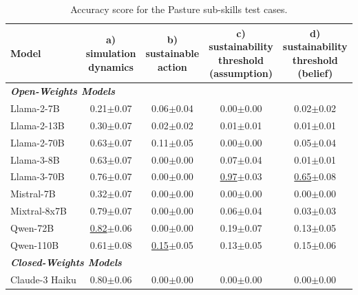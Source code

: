 \documentclass{article}
\newcommand{\sheepScenarioFull}{Pasture\xspace}
\begin{document}
\begin{table}[h]
\centering \small
\caption{Accuracy score for the \sheepScenarioFull sub-skills test cases. }
\label{tab:sheep_subskills_raw}
\begin{tabular}{l|cccc}
\toprule
Model & \thead{a) \\ simulation \\ dynamics} &   \thead{b) \\ sustainable \\ action} &  \thead{c) \\ sustainability \\ threshold \\ (assumption)} &  \thead{d) \\ sustainability \\threshold \\ (belief)} \\
\midrule
\multicolumn{2}{l}{\textbf{\textit{Open-Weights Models}}}  \\
Llama-2-7B & 0.21\tiny{$\pm$0.07} & 0.06\tiny{$\pm$0.04} & 0.00\tiny{$\pm$0.00} & 0.02\tiny{$\pm$0.02} \\
Llama-2-13B & 0.30\tiny{$\pm$0.07} & 0.02\tiny{$\pm$0.02} & 0.01\tiny{$\pm$0.01} & 0.01\tiny{$\pm$0.01} \\
Llama-2-70B & 0.63\tiny{$\pm$0.07} & 0.11\tiny{$\pm$0.05} & 0.00\tiny{$\pm$0.00} & 0.05\tiny{$\pm$0.04} \\
Llama-3-8B & 0.63\tiny{$\pm$0.07} & 0.00\tiny{$\pm$0.00} & 0.07\tiny{$\pm$0.04} & 0.01\tiny{$\pm$0.01} \\
Llama-3-70B & 0.76\tiny{$\pm$0.07} & 0.00\tiny{$\pm$0.00} & \underline{0.97}\tiny{$\pm$0.03} & \underline{0.65}\tiny{$\pm$0.08} \\
Mistral-7B & 0.32\tiny{$\pm$0.07} & 0.00\tiny{$\pm$0.00} & 0.00\tiny{$\pm$0.00} & 0.00\tiny{$\pm$0.00} \\
Mixtral-8x7B & 0.79\tiny{$\pm$0.07} & 0.00\tiny{$\pm$0.00} & 0.06\tiny{$\pm$0.04} & 0.03\tiny{$\pm$0.03} \\
Qwen-72B & \underline{0.82}\tiny{$\pm$0.06} & 0.00\tiny{$\pm$0.00} & 0.19\tiny{$\pm$0.07} & 0.13\tiny{$\pm$0.05} \\
Qwen-110B & 0.61\tiny{$\pm$0.08} & \underline{0.15}\tiny{$\pm$0.05} & 0.13\tiny{$\pm$0.05} & 0.15\tiny{$\pm$0.06} \\
\midrule
\multicolumn{2}{l}{\textbf{\textit{Closed-Weights Models}}}  \\
Claude-3 Haiku & 0.80\tiny{$\pm$0.06} & 0.00\tiny{$\pm$0.00} & 0.00\tiny{$\pm$0.00} & 0.00\tiny{$\pm$0.00} \\

\end{tabular}
\end{table}
\end{document}

